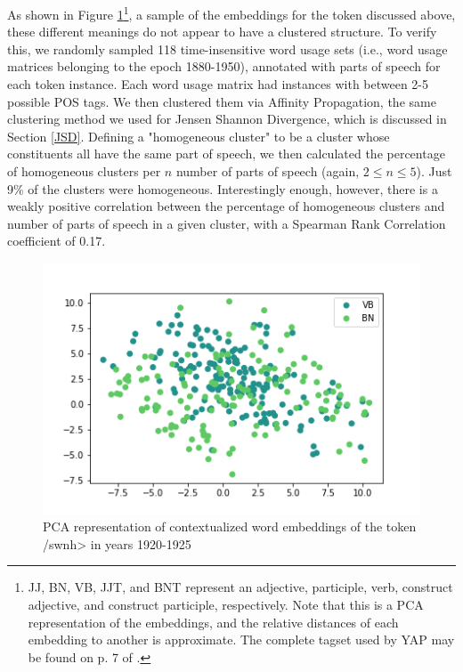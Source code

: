 \documentclass[10pt, a4paper]{article}
\begin{document}
As shown in Figure \ref{embeddings_pos}\footnote{JJ, BN, VB, JJT, and BNT represent an adjective, participle, verb, construct adjective, and construct participle, respectively. Note that this is a PCA representation of the embeddings, and the relative distances of each embedding to another is approximate. The complete tagset used by YAP may be found on p. 7 of .}, a sample of the embeddings for the token discussed above, these different meanings do not appear to have a clustered structure. 
To verify this, we randomly sampled 118 time-insensitive word usage sets (i.e., word usage matrices belonging to the epoch 1880-1950), annotated with parts of speech for each token instance. Each word usage matrix had instances with between 2-5 possible POS tags. We then clustered them via Affinity Propagation, the same clustering method we used for Jensen Shannon Divergence, which is discussed in Section \ref{JSD}. Defining a "homogeneous cluster" to be a cluster whose constituents all have the same part of speech, we then calculated the percentage of homogeneous clusters per $n$ number of parts of speech (again, $2 \leq n \leq 5$). Just 9\% of the clusters were homogeneous. Interestingly enough, however, there is a weakly positive correlation between the percentage of homogeneous clusters and number of parts of speech in a given cluster, with a Spearman Rank Correlation coefficient of 0.17.

\begin{figure}[!h]
\begin{center}
\includegraphics[scale=0.5]{code/embeddings_by_pos/שונה_1920.png}
\caption{PCA representation of contextualized word embeddings of the token \</swnh> in years 1920-1925}
\label{embeddings_pos}
\end{center}
\end{figure}
\end{document}
